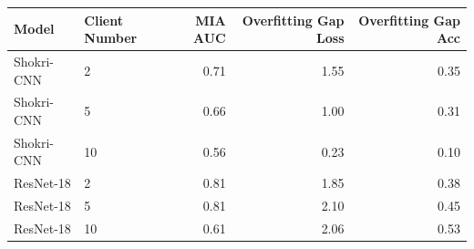 \begin{tabular}{llrrr}
\toprule
Model & Client Number & MIA AUC & Overfitting Gap Loss & Overfitting Gap Acc \\
\midrule
Shokri-CNN & 2 & 0.71 & 1.55 & 0.35 \\
Shokri-CNN & 5 & 0.66 & 1.00 & 0.31 \\
Shokri-CNN & 10 & 0.56 & 0.23 & 0.10 \\
ResNet-18 & 2 & 0.81 & 1.85 & 0.38 \\
ResNet-18 & 5 & 0.81 & 2.10 & 0.45 \\
ResNet-18 & 10 & 0.61 & 2.06 & 0.53 \\
\bottomrule
\end{tabular}
